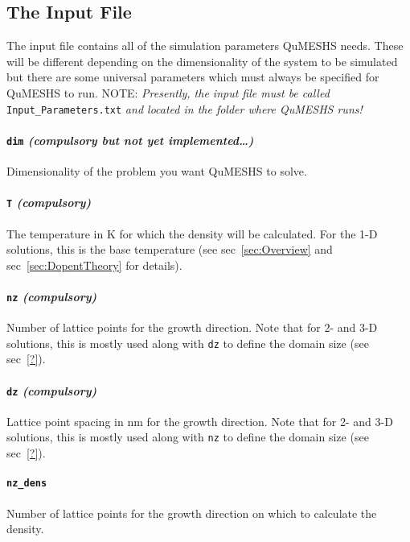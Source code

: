 \documentclass[12pt]{article}
\begin{document}
\subsection{The Input File}
\label{subsec:InputFile}

The input file contains all of the simulation parameters QuMESHS needs.  These will
be different depending on the dimensionality of the system to be simulated but there
are some universal parameters which must always be specified for QuMESHS to run.
{\color{red} NOTE:} \emph{Presently, the input file must be called} \texttt{Input\_Parameters.txt}
\emph{and located in the folder where QuMESHS runs!}

\paragraph{\texttt{dim} \emph{(compulsory but not yet implemented\ldots)}}
Dimensionality of the problem you want QuMESHS to solve.

\paragraph{\texttt{T} \emph{(compulsory)}}
The temperature in K for which the density will be calculated.  For the 1-D solutions,
this is the base temperature (see sec~\ref{sec:Overview} and sec~\ref{sec:DopentTheory}
for details).

\paragraph{\texttt{nz} \emph{(compulsory)}}
Number of lattice points for the growth direction.  Note that for 2- and 3-D solutions,
this is mostly used along with \texttt{dz} to define the domain size (see sec~\ref{?}).

\paragraph{\texttt{dz} \emph{(compulsory)}}
Lattice point spacing in nm for the growth direction.  Note that for 2- and 3-D
solutions, this is mostly used along with \texttt{nz} to define the domain size
(see sec~\ref{?}).

\paragraph{\texttt{nz\_dens}}
Number of lattice points for the growth direction on which to calculate the density.
\end{document}
